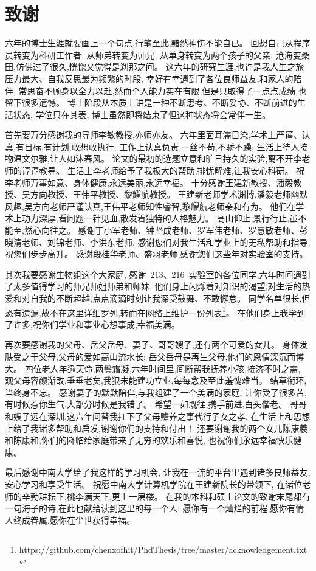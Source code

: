 \section{致谢} %

六年的博士生涯就要画上一个句点,行笔至此,黯然神伤不能自已。
回想自己从程序员转变为科研工作者,
从师弟转变为师兄,
从单身转变为两个孩子的父亲,
沧海变桑田,仿佛过了很久,恍惚又觉得是刹那之间。
这六年的研究生涯,也许是我人生之旅压力最大、自我反思最为频繁的时段,
幸好有幸遇到了各位良师益友,和家人的陪伴,
常思奋不顾身以全力以赴,然而个人能力实在有限,但是只取得了一点点成绩,也留下很多遗憾。
博士阶段从本质上讲是一种不断思考、不断妥协、不断前进的生活状态,
学位只在其表,
博士虽然即将结束了但这种状态将会常伴一生。

首先要万分感谢我的导师李敏教授,亦师亦友。
六年里面耳濡目染,学术上严谨、认真,有目标,有计划,敢想敢执行;
工作上认真负责,一丝不苟,不骄不躁;
生活上待人接物温文尔雅,让人如沐春风。
论文的最初的选题立意和旷日持久的实验,离不开李老师的谆谆教导。
生活上李老师给予了我极大的帮助,排忧解难,让我安心科研。
祝李老师万事如意、身体健康,永远美丽,永远幸福。
十分感谢王建新教授、潘毅教授、吴方向教授、王伟平教授、黎耀航教授。
王建新老师学术渊博,潘毅老师幽默风趣,吴方向老师严谨认真,王伟平老师知性睿智,黎耀航老师亲和有为。
他们在学术上功力深厚,看问题一针见血,散发着独特的人格魅力。
高山仰止,景行行止,虽不能至,然心向往之。
感谢丁小军老师、钟坚成老师、罗军伟老师、罗慧敏老师、彭晓清老师、刘锦老师、李洪东老师,
感谢您们对我生活和学业上的无私帮助和指导,祝您们步步高升。
感谢段桂华老师、盛羽老师,感谢您们这些年对实验室的支持。

其次我要感谢生物组这个大家庭,
感谢~213、216~实验室的各位同学,六年时间遇到了太多值得学习的师兄师姐师弟和师妹,
他们身上闪烁着对知识的渴望,对生活的热爱和对自我的不断超越,点点滴滴时刻让我深受鼓舞、不敢懈怠。
同学名单很长,但恐有遗漏,故不在这里详细罗列,转而在网络上维护一份列表\footnote{https://github.com/chenxofhit/PhdThesis/tree/master/acknowledgement.txt}。
在他们身上我学到了许多,祝你们学业和事业心想事成,幸福美满。

再次要感谢我的父母、岳父岳母、妻子、哥哥嫂子,还有两个可爱的女儿。
身体发肤受之于父母,父母的爱如高山流水长;
岳父岳母是再生父母,他们的恩情深沉而博大。
四位老人年逾天命,两鬓霜凝,六年时间里,间断帮我抚养小孩,接济不时之需,
观父母容颜渐改,垂垂老矣,我狠未能建功立业,每每念及至此羞愧难当。
结草衔环,当终身不忘。
感谢妻子的默默陪伴,与我组建了一个美满的家庭,
让你受了很多苦,有时候惹你生气,大部分时候是我错了。
希望一如既往,携手前进,白头偕老。
哥哥和嫂子远在深圳,这六年间替我扛下了父母赡养之事代行子女之孝,
在生活上和思想上给了我诸多帮助和启发,谢谢你们的支持和付出！
还要谢谢我的两个女儿陈康羲和陈康和,你们的降临给家庭带来了无穷的欢乐和喜悦,
也祝你们永远幸福快乐健康。

最后感谢中南大学给了我这样的学习机会, 
让我在一流的平台里遇到诸多良师益友,
安心学习和享受生活。
祝愿中南大学计算机学院在王建新院长的带领下, 
在诸位老师的辛勤耕耘下,桃李满天下,更上一层楼。
在我的本科和硕士论文的致谢末尾都有一句海子的诗,在此也献给读到这里的每一个人:
愿你有一个灿烂的前程,愿你有情人终成眷属,愿你在尘世获得幸福。